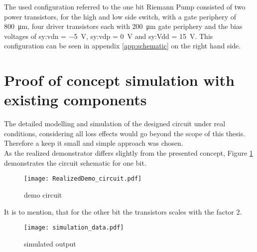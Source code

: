 The used configuration referred to the one bit Riemann Pump consisted of two power transistors, for the high and low side switch, with a gate periphery of \SI{800}{\micro \meter}, four driver transistors each with \SI{200}{\micro \meter} gate periphery and the bias voltages of \gls{sy:vdn} = \SI{-5}{\volt}, \gls{sy:vdp} = \SI{0}{\volt} and \gls{sy:Vdd} = \SI{15}{\volt}.
This configuration can be seen in appendix \ref{app:schematic} on the right hand side.

\section{Proof of concept simulation with existing components}
\label{ch:ProofOfConceptWithExistingComponents}
The detailed modelling and simulation of the designed circuit under real conditions, considering all loss effects would go beyond the scope of this thesis. Therefore a keep it small and simple approach was chosen.\\   

As the realized demonstrator differs slightly from the presented concept, Figure \ref{fig:democircuit} demonstrates the circuit schematic for one bit.
\begin{figure}[htb!]
	\centering
  \texttt{[image: RealizedDemo\_circuit.pdf]}
	\caption{demo circuit}
	\label{fig:democircuit}
\end{figure}

It is to mention, that for the other bit the transistors scales with the factor 2.

\begin{figure}[htb!]
	\centering
  \texttt{[image: simulation\_data.pdf]}
	\caption{simulated output}
	\label{fig:sim}
\end{figure}

